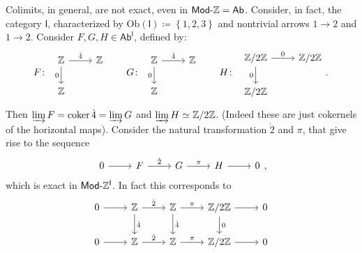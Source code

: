 \begin{rem}
	Colimits, in general, are not exact, even in $\mathsf{Mod}\text{-}\mathbb{Z} = \mathsf{Ab}$.
	Consider, in fact, the category $\mathsf{I}$, characterized by
	$\mathrm{Ob} \left(\mathsf{I}\right) \coloneqq \left\{ 1, 2, 3 \right\}$ and nontrivial arrows
	$1 \to 2$ and $1 \to 2$.
	Consider $F, G, H \in \mathsf{Ab}^{\mathsf{I}}$, defined by:
	\begin{equation}
	F \colon \ \, 
	\begin{tikzcd}
		\Z \arrow[r, "\dot{4}", rightarrow] \arrow[d, "0"', rightarrow] & \Z \\
		\Z &
	\end{tikzcd}\qquad
	G \colon \ \,
	\begin{tikzcd}
		\Z \arrow[r, "\dot{4}", rightarrow] \arrow[d, "0"', rightarrow] & \Z \\
		\Z &
	\end{tikzcd}\qquad
	H \colon \ \,
	\begin{tikzcd}
		\mathbb{Z}/2\mathbb{Z} \arrow[r, "0", rightarrow] \arrow[d, "0"', rightarrow] & \mathbb{Z}/2\mathbb{Z} \\
		\mathbb{Z}/2\mathbb{Z} &
	\end{tikzcd}
	.\end{equation} 
	Then $\varinjlim F = \operatorname{coker} \dot{4} = \varinjlim G$ and $\varinjlim H \simeq \mathbb{Z}/2\mathbb{Z}$.
	(Indeed these are just cokernels of the horizontal maps).
	Consider the natural transformation $\dot{2}$ and $\pi$, that give rise to the sequence
	\begin{equation}
	\begin{tikzcd}
		0 \arrow[r, "", rightarrow] &
		F \arrow[r, "\dot{2}", rightarrow] &
		G \arrow[r, "\pi", rightarrow] &
		H \arrow[r, "", rightarrow] &
		0
	\end{tikzcd}
	,\end{equation} 
	which is exact in $\mathsf{Mod}\text{-}\mathbb{Z}^{\mathsf{I}}$.
	In fact this corresponds to
	\begin{equation}
	\begin{tikzcd}
		0 \arrow[r, "", rightarrow] &
		\Z \arrow[r, "\dot{2}", rightarrow] \arrow[d, "\dot{4}", rightarrow] &
		\Z \arrow[r, "\pi", rightarrow] \arrow[d, "\dot{4}", rightarrow] &
		\mathbb{Z}/2\mathbb{Z} \arrow[r, "", rightarrow] \arrow[d, "0", rightarrow] &
		0 \\
		0 \arrow[r, "", rightarrow] &
		\Z \arrow[r, "\dot{2}", rightarrow]&
		\Z \arrow[r, "\pi", rightarrow] &
		\mathbb{Z}/2\mathbb{Z} \arrow[r, "", rightarrow] &
		0
	\end{tikzcd}

\end{equation}
\end{rem}
